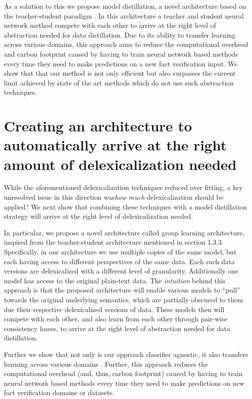 As a solution to this we propose model distillation, a novel architecture based on the teacher-student paradigm \cite{hinton2015distilling}. In this architecture a teacher and student neural network method compete with each other to arrive at the right level of abstraction needed for data distillation. 
Due to its ability to transfer learning across various domains, this approach aims to reduce the computational overhead and carbon footprint caused by having to train neural network based methods every time they need to make predictions on a new fact verification input. We show that that our method is not only efficient but also surpasses the current limit achieved by state of the art methods which do not use such abstraction techniques. 

\section{Creating an architecture to automatically arrive at the right amount of delexicalization needed}



 While the aforementioned delexicalization techniques reduced over fitting, a key unresolved issue in this direction was\textit{how much} delexicalization should be applied? We next show that combining these techniques with a model distillation strategy will arrive at the right level of delexicalization needed.

In particular, we propose a novel architecture called group learning architecture, inspired from the teacher-student architecture mentioned in section 1.3.3. Specifically, in our architecture we use multiple copies of the same model, but each having access to different perspectives of the same data. Each such data versions are delexicalized with a different level of granularity. Additionally one model has access to the original plain-text data. The \textit{intuition} behind this approach is that the proposed architecture will enable various models to ``pull'' towards the original underlying semantics, which are partially obscured to them due their respective delexicalized versions of data. These models then will
 compete with each other, and also learn from each other through pair-wise consistency losses, to arrive at the right level of abstraction needed for data distillation.
  
  Further we show that not only is our approach classifier agnostic, it also transfers learning across various domains \citep{mithun2021data}. Further, this approach  reduces the computational overhead (and, thus, carbon footprint) caused by having to train neural network based methods every time they need to make predictions on new fact verification domains or datasets.





